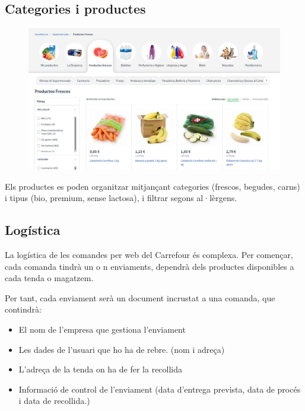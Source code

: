 \newpage 

\subsection{Categories i productes}

\begin{figure}[htpb!]
    \centering
    \includegraphics[width=400pt]{figures/Productes.png}
\end{figure}

Els productes es poden organitzar mitjançant categories (frescos, begudes, carns) i tipus (bio, premium, sense lactosa), 
i filtrar segons al·lèrgens.

\subsection{Logística}

La logística de les comandes per web del Carrefour és complexa. Per començar, cada comanda tindrà
un o n enviaments, dependrà dels productes disponibles a cada tenda o magatzem.

Per tant, cada enviament serà un document incrustat a una comanda, que contindrà:

\begin{itemize}
    \item El nom de l'empresa que gestiona l'enviament
    \item Les dades de l'usuari que ho ha de rebre. (nom i adreça)
    \item L'adreça de la tenda on ha de fer la recollida
    \item Informació de control de l'enviament (data d'entrega prevista, data de procés i data de recollida.)
\end{itemize}